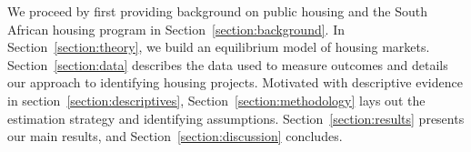 \documentclass[12pt]{article}
\begin{document}
We proceed by first providing background on public housing and the South African housing program in Section~\ref{section:background}.  In Section~\ref{section:theory}, we build an equilibrium model of housing markets.  Section~\ref{section:data} describes the data used to measure outcomes and details our approach to identifying housing projects. Motivated with descriptive evidence in section~\ref{section:descriptives}, Section~\ref{section:methodology} lays out the estimation strategy and identifying assumptions. Section~\ref{section:results} presents our main results, and  Section~\ref{section:discussion} concludes.




\end{document}
